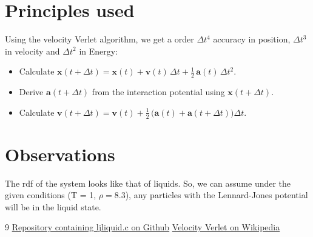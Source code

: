 \documentclass{article}
\begin{document}
\section*{Principles used}
Using the velocity Verlet algorithm, we get a order $\Delta t^4$ accuracy in position, $\Delta t^3$ in velocity and $\Delta t^2$ in Energy\cite{veve}:
\begin{itemize}
    \item Calculate $\mathbf {x} (t+\Delta t)=\mathbf {x} (t)+\mathbf {v} (t)\,\Delta t+\tfrac{1}{2}\,\mathbf {a} (t)\,\Delta t^{2}$.
    \item Derive $\displaystyle \mathbf {a} (t+\Delta t)$ from the interaction potential using $\displaystyle \mathbf {x} (t+\Delta t)$.
    \item Calculate $\displaystyle \mathbf {v} (t+\Delta t)=\mathbf {v} (t)+{\tfrac {1}{2}}\,{\bigl (}\mathbf {a} (t)+\mathbf {a} (t+\Delta t){\bigr )}\Delta t$.
\end{itemize}

\section*{Observations}
The rdf of the system looks like that of liquids. So, we can assume under the given conditions (T = 1, $\rho = 8.3$), any particles with the Lennard-Jones potential will be in the liquid state.


\begin{thebibliography}{9}
    \href{https://github.com/Vedant36/ljliquid}{Repository containing ljliquid.c on Github}
    \href{https://en.wikipedia.org/wiki/Verlet_integration#Velocity_Verlet}{Velocity Verlet on Wikipedia}
\end{thebibliography}
\end{document}
